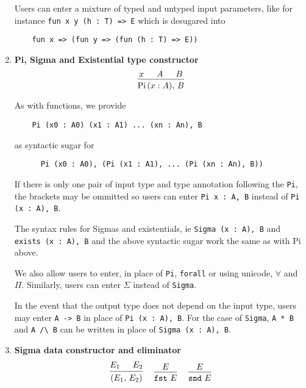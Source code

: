 \documentclass{article}
\begin{document}
\begin{enumerate}
  Users can enter a mixture of typed and untyped input parameters, like for
  instance \verb|fun x y (h : T) => E|
  which is desugared into 
  \begin{verbatim}
    fun x => (fun y => (fun (h : T) => E))
  \end{verbatim}

\item \textbf{Pi, Sigma and Existential type constructor} \\
  \[
    \begin{prooftree}
      \hypo{x}
      \hypo{A}
      \hypo{B}
      \infer3{\Pii \, (x : A), \, B}
    \end{prooftree}
 \]

  As with functions, we provide
  \begin{verbatim}
    Pi (x0 : A0) (x1 : A1) ... (xn : An), B
  \end{verbatim}

  as syntactic sugar for

  \begin{verbatim}
      Pi (x0 : A0), (Pi (x1 : A1), ... (Pi (xn : An), B))
  \end{verbatim}

  If there is only one pair of input type and type annotation following the \verb|Pi|,
  the brackets may be ommitted so users can enter \verb|Pi x : A, B| instead of
  \verb|Pi (x : A), B|.

  The syntax rules for Sigmas and existentials, ie 
  \verb|Sigma (x : A), B| and \verb|exists (x : A), B| and the above syntactic
  sugar work the same as with Pi above. 

  We also allow users to enter, in place of \verb|Pi|, \verb|forall| or using
  unicode, $\forall$ and $\Pi$.
  Similarly, users can enter $\Sigma$ instead of \verb|Sigma|.

  In the event that the output type does not depend on the input type, users
  may enter \verb|A -> B| in place of \verb|Pi (x : A), B|.
  For the case of \verb|Sigma|, \verb|A * B| and \verb|A /\ B| can be written
  in place of \verb|Sigma (x : A), B|.

  \item \textbf{Sigma data constructor and eliminator} \\
  \begin{gather*}
    \begin{prooftree}
      \hypo{E_1}
      \hypo{E_2}
      \infer2{(E_1, \, E_2)}
    \end{prooftree}  
    ~ \quad
    \begin{prooftree}
      \hypo{E}
      \infer1{\fst \,\, E}
    \end{prooftree}
    ~ \quad
   \begin{prooftree}
    \hypo{E}
    \infer1{\snd \,\, E}
   \end{prooftree}
  \end{gather*}
 

\end{enumerate}
\end{document}
